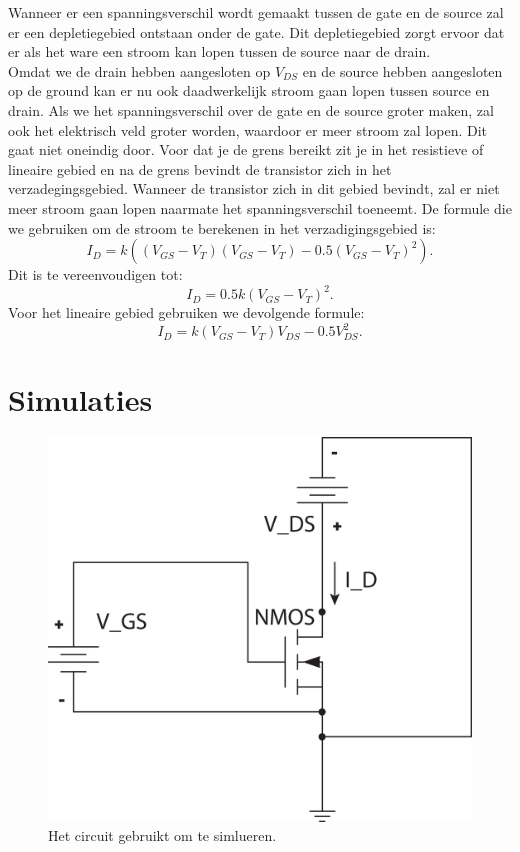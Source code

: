 \documentclass{scrartcl}  %
\begin{document}
Wanneer er een spanningsverschil wordt gemaakt tussen de gate en de source zal er een depletiegebied ontstaan onder de gate. Dit depletiegebied zorgt ervoor dat er als het ware een stroom kan lopen tussen de source naar de drain. \\
Omdat we de drain hebben aangesloten op $V_{DS}$ en de source hebben aangesloten op de ground kan er nu ook daadwerkelijk stroom gaan lopen tussen source en drain. Als we het spanningsverschil over de gate en de source groter maken, zal ook het elektrisch veld groter worden, waardoor er meer stroom zal lopen. Dit gaat niet oneindig door. Voor dat je de grens bereikt zit je in het resistieve of lineaire gebied en na de grens bevindt de transistor zich in het verzadegingsgebied. Wanneer de transistor zich in dit gebied bevindt, zal er niet meer stroom gaan lopen naarmate het spanningsverschil toeneemt. De formule die we gebruiken om de stroom te berekenen in het verzadigingsgebied is:
\begin{equation}
I_{D} = k((V_{GS} - V_{T})(V_{GS} - V_{T}) - 0.5(V_{GS} - V_{T})^{2}). 
\end{equation}
\newline Dit is te vereenvoudigen tot: 
\begin{equation} I_{D} = 0.5k(V_{GS} - V_{T})^{2}.
\end{equation}
\newline Voor het lineaire gebied gebruiken we devolgende formule: 
\begin{equation}
I_{D} = k(V_{GS} - V_{T})V_{DS} - 0.5V_{DS}^{2}.
\end{equation}


\section{Simulaties}

\begin{figure}[H]
\centering
		\includegraphics[width=\textwidth]{resources/NMOS_circuit}
		\caption{Het circuit gebruikt om te simlueren.}
		\label{fig:circuit}
\end{figure}
\end{document}
